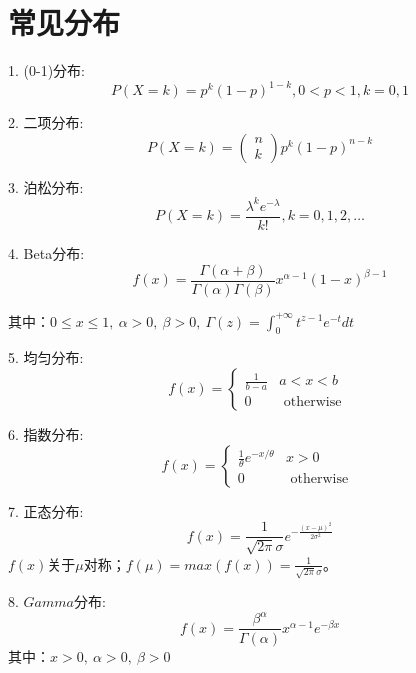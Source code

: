 \section{常见分布}
1. (0-1)分布:
\begin{equation}
    P(X=k)=p^{k}(1-p)^{1-k}, 0<p<1, k=0,1
\end{equation}

2. 二项分布: 
\begin{equation}
    P(X=k)=\left(\begin{array}{l}n \\k\end{array}\right) p^{k}(1-p)^{n-k}
\end{equation}

3. 泊松分布: 
\begin{equation}
    P(X=k)=\frac{\lambda^{k} e^{-\lambda}}{k !}, k=0,1,2, \ldots
\end{equation}

4. Beta分布: 
   \begin{equation}
    f(x)=\frac{\Gamma(\alpha+\beta)}{\Gamma(\alpha) \Gamma(\beta)} x^{\alpha-1}(1-x)^{\beta-1}
   \end{equation}
   
   其中：$0\leq x\leq 1, \ \alpha>0,\ \beta>0,\ \Gamma(z)=\int_{0}^{+\infty} t^{z-1} e^{-t} d t$

5. 均匀分布: 
   \begin{equation}
        f(x)=\left\{\begin{array}{ll}\frac{1}{b-a} & a<x<b \\0 & \text { otherwise }\end{array}\right.
   \end{equation}
   
6. 指数分布: 
\begin{equation}
    f(x)=\left\{\begin{array}{ll}\frac{1}{\theta} e^{-x / \theta} & x>0 \\0 & \text { otherwise }\end{array}\right.
\end{equation}

7. 正态分布: 
\begin{equation}
    f(x)=\frac{1}{\sqrt{2 \pi} \sigma} e^{-\frac{(x-\mu)^{2}}{2 \sigma^{2}}}
\end{equation}
   $f(x)$关于$\mu$对称；$f(\mu)=max(f(x))=\frac{1}{\sqrt{2\pi}\sigma}$。

8. $Gamma$分布: 
\begin{equation}
   f(x)=\frac{\beta^{\alpha}}{\Gamma(\alpha)} x^{\alpha-1} e^{-\beta x}
\end{equation}
   其中：$x>0,\ \alpha>0,\ \beta>0$

